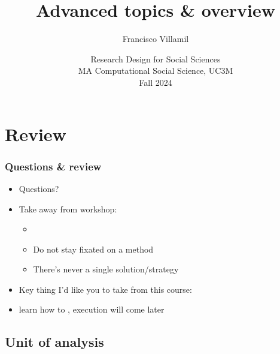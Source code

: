 \documentclass[aspectratio=43]{beamer}
\title[Lecture 5: Advanced topics]{\Large Advanced topics \& overview}
\author[]{Francisco Villamil}
\date[]{Research Design for Social Sciences\\MA Computational Social Science, UC3M\\Fall 2024}
\begin{document}

\begin{frame}
  \titlepage
\end{frame}

\section{Review}

\begin{frame}
\frametitle{Questions \& review}
\centering

\begin{itemize}
  \item Questions?
  \item<2-> Take away from workshop:
  \begin{itemize}
    \item {}
    \item Do not stay fixated on a method
    \item There's never a single solution/strategy
  \end{itemize}
  \item<3-> Key thing I'd like you to take from this course:
  \item<3->[] learn how to , execution will come later
\end{itemize}

\end{frame}

\subsection*{Unit of analysis}
\end{document}
